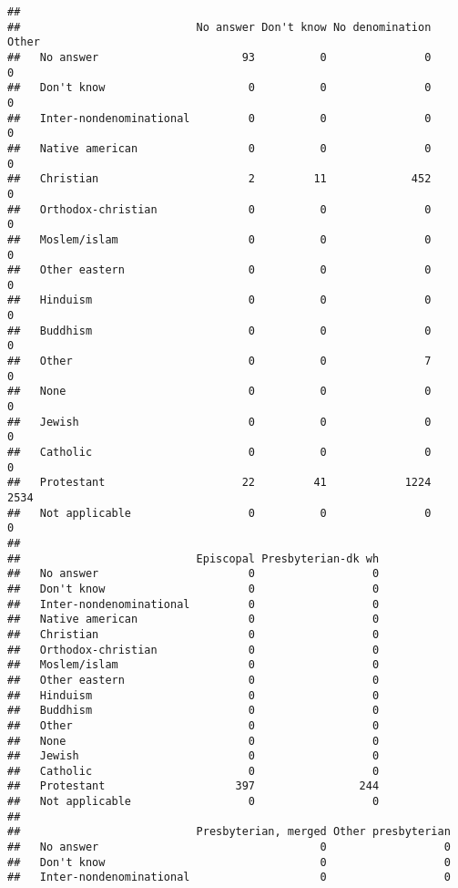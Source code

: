 \documentclass[]{article}
\theoremstyle{definition}
\theoremstyle{definition}
\theoremstyle{definition}
\theoremstyle{remark}
\begin{document}
\begin{verbatim}
##                          
##                           No answer Don't know No denomination Other
##   No answer                      93          0               0     0
##   Don't know                      0          0               0     0
##   Inter-nondenominational         0          0               0     0
##   Native american                 0          0               0     0
##   Christian                       2         11             452     0
##   Orthodox-christian              0          0               0     0
##   Moslem/islam                    0          0               0     0
##   Other eastern                   0          0               0     0
##   Hinduism                        0          0               0     0
##   Buddhism                        0          0               0     0
##   Other                           0          0               7     0
##   None                            0          0               0     0
##   Jewish                          0          0               0     0
##   Catholic                        0          0               0     0
##   Protestant                     22         41            1224  2534
##   Not applicable                  0          0               0     0
##                          
##                           Episcopal Presbyterian-dk wh
##   No answer                       0                  0
##   Don't know                      0                  0
##   Inter-nondenominational         0                  0
##   Native american                 0                  0
##   Christian                       0                  0
##   Orthodox-christian              0                  0
##   Moslem/islam                    0                  0
##   Other eastern                   0                  0
##   Hinduism                        0                  0
##   Buddhism                        0                  0
##   Other                           0                  0
##   None                            0                  0
##   Jewish                          0                  0
##   Catholic                        0                  0
##   Protestant                    397                244
##   Not applicable                  0                  0
##                          
##                           Presbyterian, merged Other presbyterian
##   No answer                                  0                  0
##   Don't know                                 0                  0
##   Inter-nondenominational                    0                  0

\end{verbatim}
\end{document}
